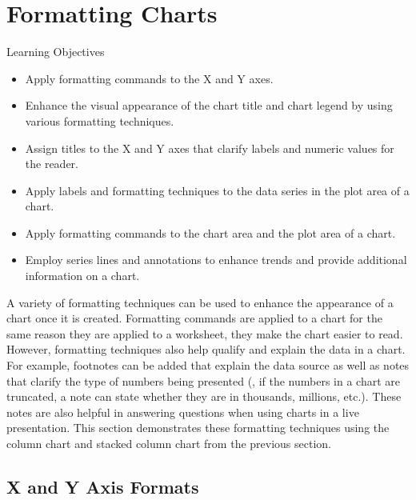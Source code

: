 \section{Formatting Charts}

\begin{center}
	\begin{objbox}{Learning Objectives}
		\begin{itemize}
			\setlength{\itemsep}{0pt}
			\setlength{\parskip}{0pt}
			\setlength{\parsep}{0pt}

			\item Apply formatting commands to the X and Y axes.
			\item Enhance the visual appearance of the chart title and chart legend by using various formatting techniques.
			\item Assign titles to the X and Y axes that clarify labels and numeric values for the reader.
			\item Apply labels and formatting techniques to the data series in the plot area of a chart.
			\item Apply formatting commands to the chart area and the plot area of a chart.
			\item Employ series lines and annotations to enhance trends and provide additional information on a chart.
			
		\end{itemize}
	\end{objbox}
\end{center}

A variety of formatting techniques can be used to enhance the appearance of a chart once it is created. Formatting commands are applied to a chart for the same reason they are applied to a worksheet, they make the chart easier to read. However, formatting techniques also help qualify and explain the data in a chart. For example, footnotes can be added that explain the data source as well as notes that clarify the type of numbers being presented (\ie, if the numbers in a chart are truncated, a note can state whether they are in thousands, millions, etc.). These notes are also helpful in answering questions when using charts in a live presentation. This section demonstrates these formatting techniques using the column chart and stacked column chart from the previous section.

\subsection{X and Y Axis Formats}

